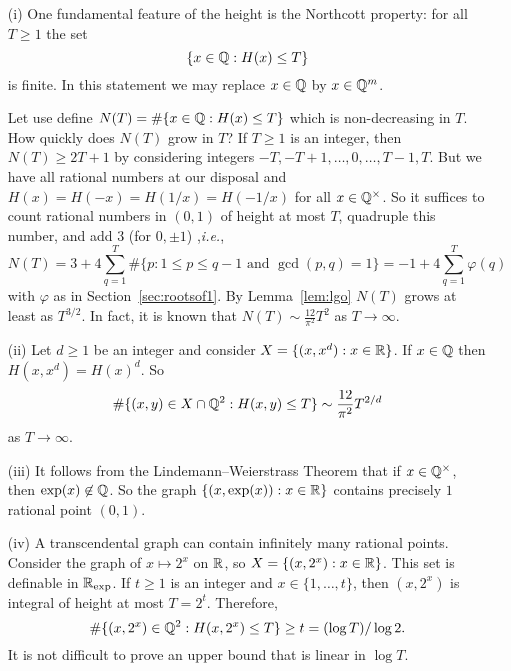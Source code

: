 \begin{example}\label{ex:heightcount1}
  \begin{enumerate}
  \item [(i)]
  One fundamental feature of the height is the Northcott property: for
  all $T\ge 1$ the set
  \begin{equation*}
    \{ x\in {\mathbb{Q}} : H(x)\le T\}
  \end{equation*}
  is finite. In this statement we may replace $x\in{\mathbb{Q}}$ by $x\in
  {\mathbb{Q}}^m$.

  Let use define $N(T) = \#\{x\in{\mathbb{Q}} : H(x)\le T\}$ which is
  non-decreasing in $T$. How quickly does $N(T)$ grow in $T$?
  If $T\ge 1$ is an integer, then $N(T) \ge 2T+1$ by considering
  integers
  $-T,-T+1,\ldots,0,\ldots,T-1,T$. But we have all rational numbers at
  our disposal and $H(x)=H(-x)=H(1/x)=H(-1/x)$ for all
  $x\in{\mathbb{Q}}^\times$. So it suffices to count rational numbers in
  $(0,1)$ of height at most $T$, quadruple this number, and add 3
  (for $0,\pm 1$)
  ,\textit{i.e.}, 
  \begin{equation*}
    N(T) = 3 + 4 \sum_{q=1}^T \# \{ p : 1\le p \le q-1 \text{ and
    }\gcd(p,q)=1\} = -1+4\sum_{q=1}^T \varphi(q)
  \end{equation*}
  with $\varphi$ as in Section~\ref{sec:rootsof1}. By Lemma~\ref{lem:lgo}
  $N(T)$ grows at least as $T^{3/2}$. In fact, it is known that
  $N(T)\sim \frac{12}{\pi^2} T^2$ as $T\rightarrow\infty$.


\item[(ii)] Let $d\ge 1$ be an integer and consider
  $X = \{(x,x^d) : x\in {\mathbb{R}}\}$. If $x\in{\mathbb{Q}}$ then $H(x,x^d) = H(x)^d$.
  So
  \begin{equation*}
    \#\{ (x,y) \in X\cap {\mathbb{Q}}^2 : H(x,y)\le T\} \sim
    \frac{12}{\pi^2}T^{2/d} 
  \end{equation*}
  as $T\rightarrow\infty$. 
  
  \item[(iii)] It follows from the Lindemann--Weierstrass Theorem that
    if $x\in{\mathbb{Q}}^\times$, then $\exp(x) \not\in{\mathbb{Q}}$. So the graph
    $\{(x,\exp(x)) : x\in{\mathbb{R}}\}$ contains precisely $1$ rational point
    $(0,1)$.

  \item[(iv)] A transcendental graph can contain infinitely many
    rational points. Consider the graph of $x\mapsto 2^x$ on ${\mathbb{R}}$, so 
    $X=\{(x,2^x) : x \in{\mathbb{R}}\}$. This set is definable in ${{\mathbb{R}}_{\mathrm{exp}}}$.
    If $t\ge 1$ is an integer and $x\in \{1,\ldots,t\}$, then
    $(x,2^x)$ is integral of height at most $T=2^t$. Therefore,
    \begin{equation*}
      \# \{(x,2^x)\in{\mathbb{Q}}^2 : H(x,2^x)\le T\} \ge t= (\log T)/\log 2.
    \end{equation*}
    It is not difficult to prove an upper bound that is linear in
    $\log T$. 
\end{enumerate}
\end{example}

